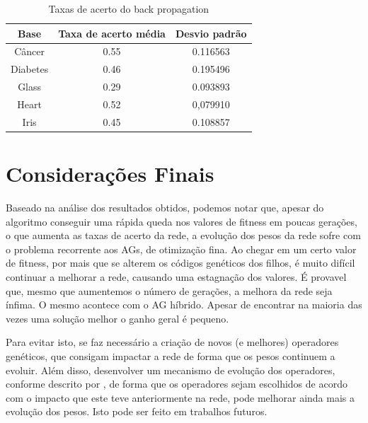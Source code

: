 \documentclass[12pt]{article}
\begin{document}
\begin{table}[h!]
\center
\begin{tabular}{|c|c|c|}
\hline
Base & Taxa de acerto média & Desvio padrão\\ \hline
Câncer & 0.55 & 0.116563 \\ \hline
Diabetes & 0.46 & 0.195496 \\ \hline
Glass & 0.29 & 0.093893 \\ \hline
Heart & 0.52 & 0,079910 \\ \hline
Iris & 0.45 & 0.108857 \\ \hline
\end{tabular}
\caption{Taxas de acerto do back propagation}
\label{tab:hitaim}
\end{table}

\section{Considerações Finais}

Baseado na análise dos resultados obtidos, podemos notar que, apesar do algoritmo conseguir uma rápida queda nos valores de fitness em poucas gerações, o que aumenta as taxas de acerto da rede, a evolução dos pesos da rede sofre com o problema recorrente aos AGs, de otimização fina. Ao chegar em um certo valor de fitness, por mais que se alterem os códigos genéticos dos filhos, é muito difícil continuar a melhorar a rede, causando uma estagnação dos valores. É provavel que, mesmo que aumentemos o número de gerações, a melhora da rede seja ínfima. O mesmo acontece com o AG híbrido. Apesar de encontrar na maioria das vezes uma solução melhor o ganho geral é pequeno.

Para evitar isto, se faz necessário a criação de novos (e melhores) operadores genéticos, que consigam impactar a rede de forma que os pesos continuem a evoluir. Além disso, desenvolver um mecanismo de evolução dos operadores, conforme descrito por \cite{montana}, de forma que os operadores sejam escolhidos de acordo com o impacto que este teve anteriormente na rede, pode melhorar ainda mais a evolução dos pesos. Isto pode ser feito em trabalhos futuros.



\end{document}
